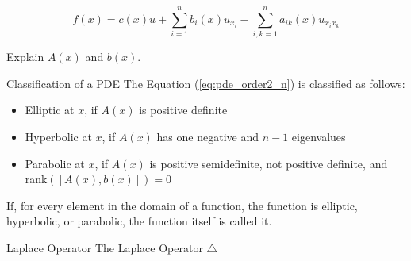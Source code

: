 

\begin{equation}
	f(x) = c(x) u + \sum_{i=1}^{n}b_i(x)u_{x_{i}}
	- \sum_{i,k=1}^{n}a_{ik}(x)u_{x_ix_k}
	\label{eq:pde_order2_n}
\end{equation}

Explain $A(x)$ and $b(x)$.

\begin{defn}{Classification of a PDE}
	The Equation (\ref{eq:pde_order2_n}) is classified as follows:
	\begin{itemize}
		\item Elliptic at $x$, if $A(x)$ is positive definite
		\item Hyperbolic at $x$, if $A(x)$ has one negative and $n-1$ eigenvalues
		\item Parabolic at $x$, if $A(x)$ is positive semidefinite, not positive definite, and rank$([A(x), b(x)])=0$
	\end{itemize}

	If, for every element in the domain of a function, the function is elliptic, hyperbolic, or parabolic, the function itself is called it.
\end{defn}


\begin{defn}{Laplace Operator}
	The Laplace Operator $\triangle$
\end{defn}